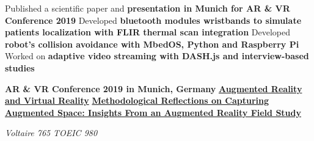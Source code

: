 \documentclass[10pt,a4paper,ragged2e,withhyper]{altacv}
\begin{document}
\newpage
{}
\begin{paracol}{2}

Published a scientific paper and \textbf{presentation in Munich for AR \& VR Conference 2019}
\smallbreak
\divider
{}
Developed \textbf{bluetooth modules wristbands to simulate patients localization with FLIR thermal scan integration}
\smallbreak
\divider
{}
Developed \textbf{robot's collision avoidance with MbedOS, Python and Raspberry Pi}
\smallbreak
\divider
{}
Worked on \textbf{adaptive video streaming with DASH.js and interview-based studies}

\medskip
{}
\smallbreak
\textbf{AR \& VR Conference 2019 in Munich, Germany}
\smallbreak
\smallbreak
{}
\smallbreak
\href{https://doi.org/10.1007/978-3-030-37869-1}{\textbf{Augmented Reality and Virtual Reality}}
\smallbreak
\href{https://www.cogitatiopress.com/mediaandcommunication/article/view/5316/2797}{\textbf{Methodological Reflections on Capturing Augmented Space: Insights From an Augmented Reality Field Study}}


\switchcolumn
\newpage

\textit{Voltaire 765}
\smallbreak
{}
\textit{TOEIC 980}
\smallbreak
{}
\smallbreak
{}
\smallbreak
{}


\end{paracol}
\end{document}
